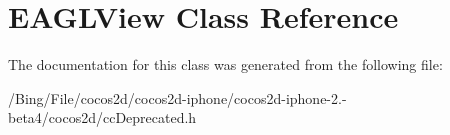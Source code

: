 \hypertarget{interface_e_a_g_l_view}{\section{E\-A\-G\-L\-View Class Reference}
\label{interface_e_a_g_l_view}
}


The documentation for this class was generated from the following file\-:\begin{DoxyCompactItemize}
\item 
/\-Bing/\-File/cocos2d/cocos2d-\/iphone/cocos2d-\/iphone-\/2.-\/beta4/cocos2d/cc\-Deprecated.\-h\end{DoxyCompactItemize}
